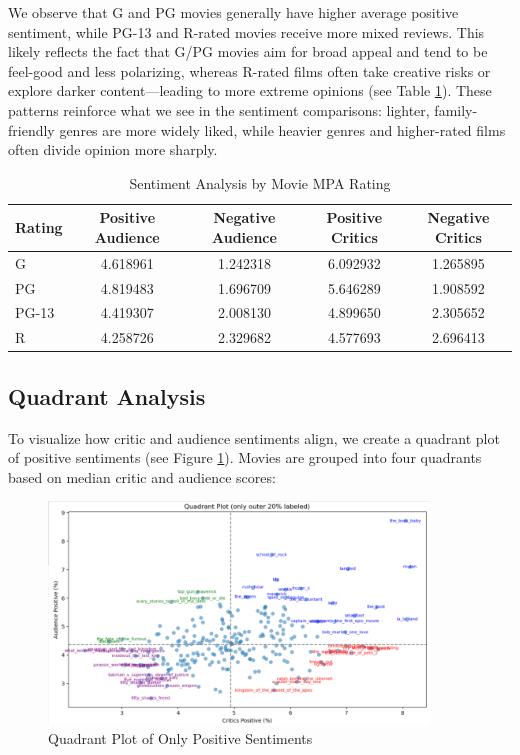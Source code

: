 \documentclass{article}
\begin{document}
We observe that G and PG movies generally have higher average positive sentiment, while PG-13 and R-rated movies receive more mixed reviews. This likely reflects the fact that G/PG movies aim for broad appeal and tend to be feel-good and less polarizing, whereas R-rated films often take creative risks or explore darker content—leading to more extreme opinions (see Table \ref{tab:sentiment_by_rating}). These patterns reinforce what we see in the sentiment comparisons: lighter, family-friendly genres are more widely liked, while heavier genres and higher-rated films often divide opinion more sharply.

\begin{table}[ht]
    \centering
    \caption{Sentiment Analysis by Movie MPA Rating}
    \begin{tabular}{lcccc}
        \toprule
        \textbf{Rating} & \textbf{Positive Audience} & \textbf{Negative Audience} & \textbf{Positive Critics} & \textbf{Negative Critics} \\
        \midrule
        G & 4.618961 & 1.242318 & 6.092932 & 1.265895 \\
        PG & 4.819483 & 1.696709 & 5.646289 & 1.908592 \\
        PG-13 & 4.419307 & 2.008130 & 4.899650 & 2.305652 \\
        R & 4.258726 & 2.329682 & 4.577693 & 2.696413 \\
        \bottomrule
    \end{tabular}
    \label{tab:sentiment_by_rating}
\end{table}

\subsection{Quadrant Analysis}
To visualize how critic and audience sentiments align, we create a quadrant plot of positive sentiments (see Figure \ref{fig:quadrant_plot}). Movies are grouped into four quadrants based on median critic and audience scores:

\begin{figure}[H]
    \centering
    \includegraphics[width=0.9\textwidth]{QuadrantPlot.png}
    \caption{Quadrant Plot of Only Positive Sentiments}
    \label{fig:quadrant_plot}
\end{figure}
\end{document}

